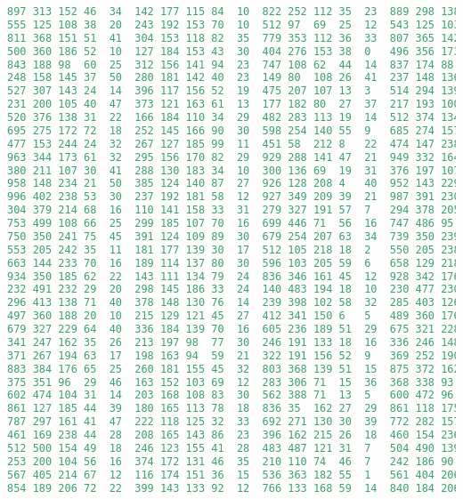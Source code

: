 \begin{lstlisting}[language=Python]
897	313	152	46	34	142	177	115	84	10	822	252	112	35	23	889	298	138	45	29
555	125	108	38	20	243	192	153	70	10	512	97	69	25	12	543	125	103	38	16
811	368	151	51	41	304	153	118	82	35	779	353	112	36	33	807	365	142	40	35
500	360	186	52	10	127	184	153	43	30	404	276	153	38	0	496	356	173	45	9
843	188	98	60	25	312	156	141	94	23	747	108	62	44	14	837	174	88	59	23
248	158	145	37	50	280	181	142	40	23	149	80	108	26	41	237	148	136	31	39
527	307	143	24	14	396	117	156	52	19	475	207	107	13	3	514	294	139	13	1
231	200	105	40	47	373	121	163	61	13	177	182	80	27	37	217	193	100	31	42
520	376	138	31	22	166	184	110	34	29	482	283	113	19	14	512	374	134	28	16
695	275	172	72	18	252	145	166	90	30	598	254	140	55	9	685	274	157	69	4
477	153	244	24	32	267	127	185	99	11	451	58	212	8	22	474	147	238	21	32
963	344	173	61	32	295	156	170	82	29	929	288	141	47	21	949	332	164	50	19
380	211	107	30	41	288	130	183	34	10	300	136	69	19	31	376	197	107	27	29
958	148	234	21	50	385	124	140	87	27	926	128	208	4	40	952	143	229	15	43
996	402	238	53	30	237	192	181	58	12	927	349	209	39	21	987	391	230	50	30
304	379	214	68	16	110	141	158	33	31	279	327	191	57	7	294	378	205	61	10
753	499	108	66	25	299	185	107	70	16	699	446	71	56	16	747	486	95	56	10
750	350	241	75	45	391	124	109	89	30	679	254	207	63	34	739	350	239	69	42
553	205	242	35	11	181	177	139	30	17	512	105	218	18	2	550	205	238	26	5
663	144	233	70	16	189	114	137	80	30	596	103	205	59	6	658	129	218	56	11
934	350	185	62	22	143	111	134	79	24	836	346	161	45	12	928	342	176	61	16
232	491	232	29	20	298	145	186	33	24	140	483	194	18	10	230	477	230	15	12
296	413	138	71	40	378	148	130	76	14	239	398	102	58	32	285	403	126	68	32
497	360	188	20	10	215	129	121	45	27	412	341	150	6	5	489	360	176	11	3
679	327	229	64	40	336	184	139	70	16	605	236	189	51	29	675	321	228	61	35
341	247	162	35	26	213	197	98	77	30	246	191	133	18	16	336	246	148	33	22
371	267	194	63	17	198	163	94	59	21	322	191	156	52	9	369	252	190	48	14
883	384	176	65	25	260	181	155	45	32	803	368	139	51	15	875	372	162	65	11
375	351	96	29	46	163	152	103	69	12	283	306	71	15	36	368	338	93	16	44
602	474	104	31	14	203	168	108	83	30	562	388	71	13	5	600	472	96	17	10
861	127	185	44	39	180	165	113	78	18	836	35	162	27	29	861	118	175	43	39
787	297	161	41	47	222	118	125	32	33	692	271	130	30	39	772	282	157	38	39
461	169	238	44	28	208	165	143	86	23	396	162	215	26	18	460	154	236	32	15
512	500	154	49	18	246	123	155	41	28	483	487	121	31	7	504	490	139	43	5
253	200	104	56	16	374	172	131	46	35	210	110	74	46	7	242	186	90	42	12
567	405	214	67	12	116	174	151	36	15	536	363	182	55	1	561	404	206	53	1
854	189	206	72	22	399	143	133	92	12	766	133	168	59	14	840	184	206	66	15

\end{lstlisting}
